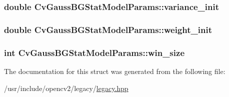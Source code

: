 \hypertarget{structCvGaussBGStatModelParams_af81821c18f94ae3fe2c1872cda910d4a}{
\subsubsection[{variance\-\_\-init}]{\setlength{\rightskip}{0pt plus 5cm}double Cv\-Gauss\-B\-G\-Stat\-Model\-Params\-::variance\-\_\-init}}\label{structCvGaussBGStatModelParams_af81821c18f94ae3fe2c1872cda910d4a}
\hypertarget{structCvGaussBGStatModelParams_a20ecf912155074c1c9f3c8bf1a756fc4}{
\subsubsection[{weight\-\_\-init}]{\setlength{\rightskip}{0pt plus 5cm}double Cv\-Gauss\-B\-G\-Stat\-Model\-Params\-::weight\-\_\-init}}\label{structCvGaussBGStatModelParams_a20ecf912155074c1c9f3c8bf1a756fc4}
\hypertarget{structCvGaussBGStatModelParams_a40244648987b33f71423b21f9a07c319}{
\subsubsection[{win\-\_\-size}]{\setlength{\rightskip}{0pt plus 5cm}int Cv\-Gauss\-B\-G\-Stat\-Model\-Params\-::win\-\_\-size}}\label{structCvGaussBGStatModelParams_a40244648987b33f71423b21f9a07c319}


The documentation for this struct was generated from the following file\-:\begin{DoxyCompactItemize}
\item 
/usr/include/opencv2/legacy/\hyperlink{legacy_8hpp}{legacy.\-hpp}\end{DoxyCompactItemize}
